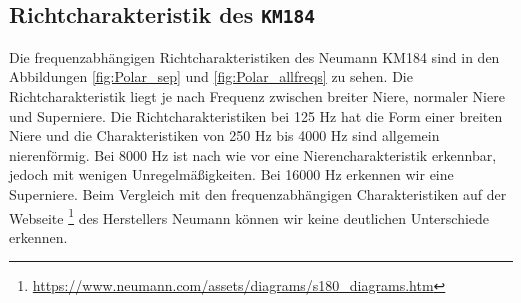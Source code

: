 \newpage
\subsection{Richtcharakteristik des \texttt{KM184}}
\label{subsec:d}
Die frequenzabhängigen Richtcharakteristiken des Neumann KM184 sind in den Abbildungen \ref{fig:Polar_sep} und \ref{fig:Polar_allfreqs} zu sehen.
Die Richtcharakteristik liegt je nach Frequenz zwischen breiter Niere, normaler Niere und Superniere. 
Die Richtcharakteristiken bei 125 Hz hat die Form einer breiten Niere und die Charakteristiken von 250 Hz bis 4000 Hz sind allgemein nierenförmig.
Bei 8000 Hz ist nach wie vor eine Nierencharakteristik erkennbar, jedoch mit wenigen Unregelmäßigkeiten.
Bei 16000 Hz erkennen wir eine Superniere.
Beim Vergleich mit den frequenzabhängigen Charakteristiken auf der Webseite \footnote{\url{https://www.neumann.com/assets/diagrams/s180_diagrams.htm}} des Herstellers Neumann können wir keine deutlichen Unterschiede erkennen.

